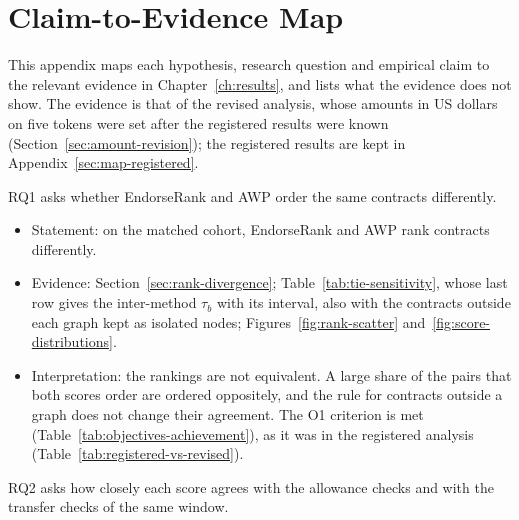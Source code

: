 \section{Claim-to-Evidence Map}
\label{ch:appendix-claims}

This appendix maps each hypothesis, research question and empirical claim to the relevant evidence in Chapter~\ref{ch:results}, and lists what the evidence does not show. The evidence is that of the revised analysis, whose amounts in US dollars on five tokens were set after the registered results were known (Section~\ref{sec:amount-revision}); the registered results are kept in Appendix~\ref{sec:map-registered}.


RQ1 asks whether EndorseRank and AWP order the same contracts differently.

\begin{itemize}
\item Statement: on the matched cohort, EndorseRank and AWP rank contracts differently.
\item Evidence: Section~\ref{sec:rank-divergence}; Table~\ref{tab:tie-sensitivity}, whose last row gives the inter-method $\tau_b$ with its interval, also with the contracts outside each graph kept as isolated nodes; Figures~\ref{fig:rank-scatter} and~\ref{fig:score-distributions}.
\item Interpretation: the rankings are not equivalent. A large share of the pairs that both scores order are ordered oppositely, and the rule for contracts outside a graph does not change their agreement. The O1 criterion is met (Table~\ref{tab:objectives-achievement}), as it was in the registered analysis (Table~\ref{tab:registered-vs-revised}).
\end{itemize}


RQ2 asks how closely each score agrees with the allowance checks and with the transfer checks of the same window.


